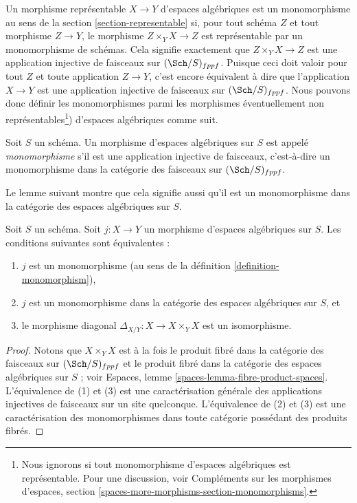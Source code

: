 \noindent
Un morphisme représentable $X \to Y$ d'espaces algébriques est un monomorphisme
au sens de la section \ref{section-representable} si, pour tout schéma
$Z$ et tout morphisme $Z \to Y$, le morphisme $Z \times_Y X \to Z$
est représentable par un monomorphisme de schémas.
Cela signifie exactement que $Z \times_Y X \to Z$
est une application injective de faisceaux sur $(\Sch/S)_{fppf}$. Puisque ceci
doit valoir pour tout $Z$ et toute application $Z \to Y$, c'est encore
équivalent à dire que l'application $X \to Y$ est une application injective de faisceaux sur
$(\Sch/S)_{fppf}$. Nous pouvons donc définir les monomorphismes parmi les morphismes
éventuellement non représentables\footnote{Nous ignorons si tout monomorphisme
d'espaces algébriques est représentable. Pour une discussion, voir
Compléments sur les morphismes d'espaces, section
\ref{spaces-more-morphisms-section-monomorphisms}.})
d'espaces algébriques comme suit.

\begin{definition}
\label{definition-monomorphism}
Soit $S$ un schéma.
Un morphisme d'espaces algébriques sur $S$ est appelé {\it monomorphisme}
s'il est une application injective de faisceaux, c'est-à-dire un monomorphisme dans la catégorie
des faisceaux sur $(\Sch/S)_{fppf}$.
\end{definition}

\noindent
Le lemme suivant montre que cela signifie aussi qu'il est un monomorphisme
dans la catégorie des espaces algébriques sur $S$.

\begin{lemma}
\label{lemma-monomorphism}
Soit $S$ un schéma.
Soit $j : X \to Y$ un morphisme d'espaces algébriques sur $S$.
Les conditions suivantes sont équivalentes :
\begin{enumerate}
\item $j$ est un monomorphisme (au sens de la définition \ref{definition-monomorphism}),
\item $j$ est un monomorphisme dans la catégorie des espaces algébriques sur $S$, et
\item le morphisme diagonal $\Delta_{X/Y} : X \to X \times_Y X$ est
un isomorphisme.
\end{enumerate}
\end{lemma}

\begin{proof}
Notons que $X \times_Y X$ est à la fois le produit fibré dans la catégorie des
faisceaux sur $(\Sch/S)_{fppf}$ et le produit fibré dans la catégorie
des espaces algébriques sur $S$ ; voir
Espaces, lemme \ref{spaces-lemma-fibre-product-spaces}.
L'équivalence de (1) et (3) est une caractérisation générale
des applications injectives de faisceaux sur un site quelconque.
L'équivalence de (2) et (3) est une caractérisation des monomorphismes
dans toute catégorie possédant des produits fibrés.
\end{proof}

